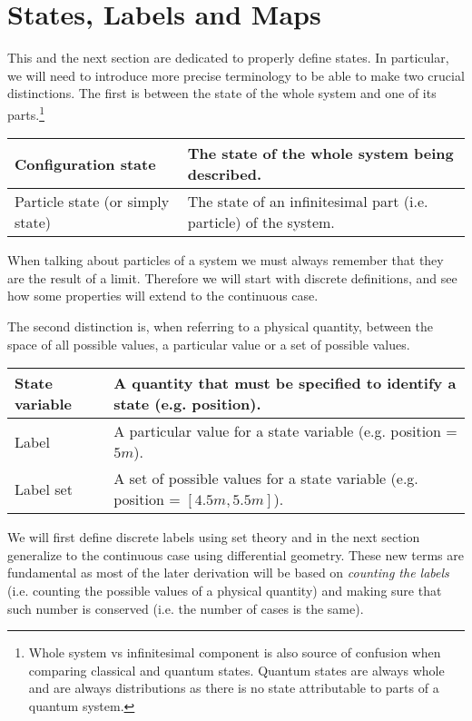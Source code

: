 \documentclass[aps,pra,10pt,twocolumn,floatfix,nofootinbib]{revtex4-1}
\theoremstyle{definition}
\begin{document}
\section{States, Labels and Maps}

This and the next section are dedicated to properly define states. In particular, we will need to introduce more precise terminology to be able to make two crucial distinctions. The first is between the state of the whole system and one of its parts.\footnote{Whole system vs infinitesimal component is also source of confusion when comparing classical and quantum states. Quantum states are always whole and are always distributions as there is no state attributable to parts of a quantum system.}
\begin{center}
    \begin{tabular}{ | p{2.5cm} | p{5.5cm} | }
    \hline
    Configuration state & The state of the whole system being described. \\ \hline
    Particle state (or simply state) & The state of an infinitesimal part (i.e. particle) of the system. \\ \hline
    \end{tabular}
\end{center}
When talking about particles of a system we must always remember that they are the result of a limit. Therefore we will start with discrete definitions, and see how some properties will extend to the continuous case.

The second distinction is, when referring to a physical quantity, between the space of all possible values, a particular value or a set of possible values.
\begin{center}
    \begin{tabular}{ | p{2.5cm} | p{5.5cm} | }
    \hline
    State variable & A quantity that must be specified to identify a state (e.g. position). \\ \hline
    Label & A particular value for a state variable (e.g. position = $5m$). \\ \hline
    Label set & A set of possible values for a state variable (e.g. position = $[4.5m, 5.5m]$). \\
    \hline
    \end{tabular}
\end{center}

We will first define discrete labels using set theory and in the next section generalize to the continuous case using differential geometry. These new terms are fundamental as most of the later derivation will be based on \emph{counting the labels} (i.e. counting the possible values of a physical quantity) and making sure that such number is conserved (i.e. the number of cases is the same).
\end{document}
